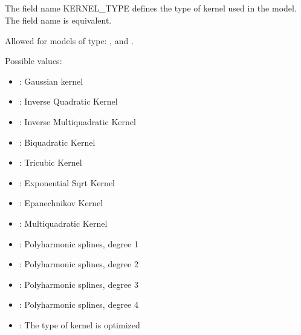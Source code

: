 \documentclass[letterpaper,10pt,english]{sphinxmanual}
\begin{document}
\subsection{}
\label{\detokenize{SgteLib:kernel-type}}\label{\detokenize{SgteLib:id15}}
\begin{DUlineblock}{0em}
\item[] The field name KERNEL\_TYPE defines the type of kernel used in the model. The field name  is equivalent.
\item[] Allowed for models of type: {\hyperref[\detokenize{SgteLib:rbf}]{}}, {\hyperref[\detokenize{SgteLib:lowess}]{}} and {\hyperref[\detokenize{SgteLib:ks}]{}}.
\item[] Possible values:
\end{DUlineblock}
\begin{itemize}
\item {} 
\sphinxAtStartPar
{}: Gaussian kernel

\item {} 
\sphinxAtStartPar
{}: Inverse Quadratic Kernel

\item {} 
\sphinxAtStartPar
{}: Inverse Multiquadratic Kernel

\item {} 
\sphinxAtStartPar
{}: Bi\sphinxhyphen{}quadratic Kernel

\item {} 
\sphinxAtStartPar
{}: Tri\sphinxhyphen{}cubic Kernel

\item {} 
\sphinxAtStartPar
{}: Exponential Sqrt Kernel

\item {} 
\sphinxAtStartPar
{}: Epanechnikov Kernel

\item {} 
\sphinxAtStartPar
{}: Multiquadratic Kernel

\item {} 
\sphinxAtStartPar
{}: Polyharmonic splines, degree 1

\item {} 
\sphinxAtStartPar
{}: Polyharmonic splines, degree 2

\item {} 
\sphinxAtStartPar
{}: Polyharmonic splines, degree 3

\item {} 
\sphinxAtStartPar
{}: Polyharmonic splines, degree 4

\item {} 
\sphinxAtStartPar
{}: The type of kernel is optimized

\end{itemize}
\end{document}
